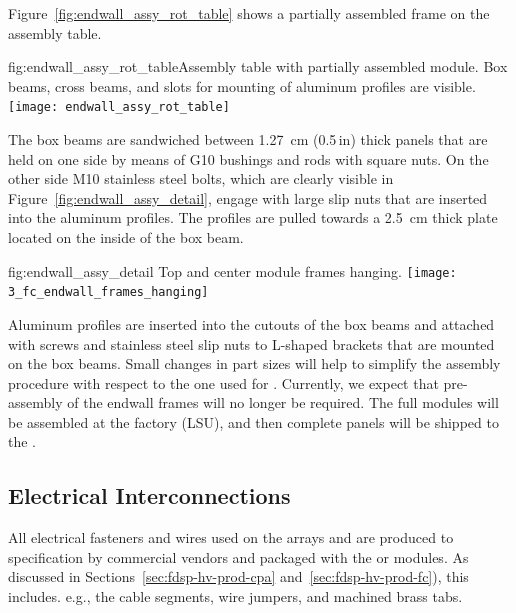 Figure~\ref{fig:endwall_assy_rot_table} shows a partially assembled   frame on the assembly table.
\begin{dunefigure}{fig:endwall_assy_rot_table}{Assembly table with partially assembled  module. Box beams, cross beams, and slots for mounting of aluminum profiles are visible.}
 \texttt{[image: endwall\_assy\_rot\_table]}
 \end{dunefigure}
The  box beams are sandwiched between \SI{1.27}{\cm} (\num{0.5}\,in) thick  panels that are held on one side by means of G10 bushings and rods with square nuts.
On the other side M10 stainless steel bolts, which are clearly visible in Figure~\ref{fig:endwall_assy_detail},  
engage with large slip nuts that are inserted into the aluminum profiles. The profiles 
are pulled towards a \SI{2.5}{\cm} thick  plate located 
on the inside of the box beam.
%

\begin{dunefigure} %
{fig:endwall_assy_detail}{%
Top and center  module frames hanging. }
\texttt{[image: 3\_fc\_endwall\_frames\_hanging]}
\end{dunefigure}


Aluminum profiles are inserted into the cutouts of the box beams and attached with screws and stainless steel slip nuts to L-shaped  brackets that are mounted on the  box beams. Small changes in part sizes will help to simplify the assembly  procedure with respect to the one used for . Currently, we expect that pre-assembly of the  endwall frames will no longer be required. The full modules will be assembled at the factory (LSU), and then complete  panels will be shipped to the . 



\subsection{Electrical Interconnections}
\label{sec:fdsp-hv-prod-interconnect}

All electrical fasteners and wires used on the  arrays and  are produced
to specification by commercial vendors and packaged with the  or  modules.  
As discussed in Sections~\ref{sec:fdsp-hv-prod-cpa} and~\ref{sec:fdsp-hv-prod-fc}), 
this includes. e.g., the  cable segments, wire jumpers, and machined brass
tabs.

